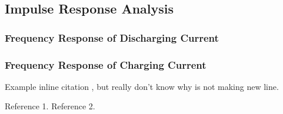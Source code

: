 \documentclass[conference]{IEEEtran}
\begin{document}
\subsection{Impulse Response Analysis}

\subsubsection{Frequency Response of Discharging Current}

\subsubsection{Frequency Response of Charging Current}

Example inline citation
\cite{b1}, but really don't know why is not making new line.


\begin{thebibliography}{00}
 Reference 1.
 Reference 2.
\end{thebibliography}
\end{document}
